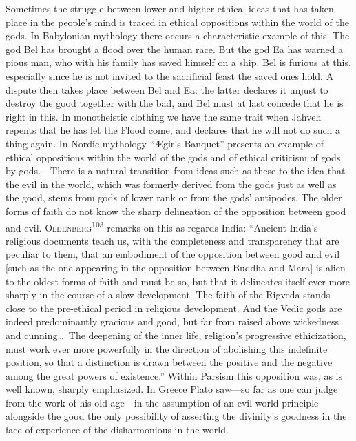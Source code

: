 \documentclass[12pt,a4paper]{book}
\newcommand{\opage}[1]{\marginnote{\footnotesize\textit{[#1]}}}
\begin{document}
Sometimes the struggle between lower and higher ethical ideas that has taken place in the people's mind is
traced in ethical oppositions within the world of the gods. In Babylonian mythology there occurs a
characteristic example of this. The god Bel has brought a flood over the human race. But the god Ea has
warned a pious man, who with his family has saved himself on a ship. Bel is furious at this, especially
since he is not invited to the sacrificial feast the saved ones hold. A dispute then takes place between
Bel and Ea: the latter declares it unjust to destroy the good together with the bad, and Bel must at last
concede that he is right in this. In monotheistic clothing we have the same trait when Jahveh repents that
he has let the Flood come, and declares that he will not do such a thing again. In Nordic mythology
``Ægir's Banquet'' presents an example of ethical oppositions within the world of the gods and of ethical
criticism of gods by gods.---There is a natural transition from ideas such as these to the idea that the
evil in the world, which was formerly derived from the gods just as well as the good, stems from gods of
lower rank or from the gods' antipodes. The older forms of faith do not know the sharp delineation of the
opposition between good and evil. \textsc{Oldenberg}\textsuperscript{103} remarks on this as regards India:
``Ancient India's religious documents teach us, with the completeness and transparency that are peculiar to
them, that an embodiment of the opposition between good and evil [such as the one appearing in the
opposition between Buddha and Mara] is alien to the oldest forms of faith and must be so, but that it
delineates itself ever more sharply in the course of a slow development. The faith of the Rigveda stands
close to the pre-ethical period in religious development. And the Vedic gods are indeed predominantly
gracious and good, but far from raised above wickedness and cunning\ldots\ The deepening of the inner life,
religion's progressive ethicization, must work ever more powerfully in the direction of abolishing 
\opage{214}this
indefinite position, so that a distinction is drawn between the positive and the negative among the great
powers of existence.'' Within Parsism this opposition was, as is well known, sharply emphasized. In Greece
Plato saw---so far as one can judge from the work of his old age---in the assumption of an evil
world-principle alongside the good the only possibility of asserting the divinity's goodness in the face of
experience of the disharmonious in the world.
\end{document}
